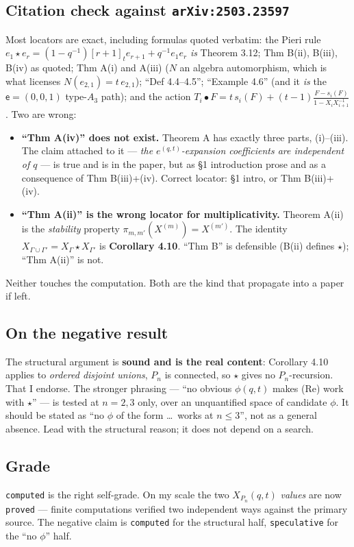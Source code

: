 \documentclass[11pt,a4paper]{article}
\newcommand{\rr}[1]{\texttt{#1}}
\begin{document}
\subsection{Citation check against \texttt{arXiv:2503.23597}}
Most locators are exact, including formulas quoted verbatim: the Pieri rule
$e_1\star e_r=(1-q^{-1})[r+1]_te_{r+1}+q^{-1}e_1e_r$ \emph{is} Theorem 3.12; Thm B(ii),
B(iii), B(iv) as quoted; Thm A(i) and A(iii) ($N$ an algebra automorphism, which is what
licenses $N(e_{2,1})=t\,e_{2,1}$); ``Def 4.4--4.5''; ``Example 4.6'' (and it \emph{is} the
$\mathsf e=(0,0,1)$ type-$A_3$ path); and the action
$T_i\bullet F=t\,s_i(F)+(t-1)\frac{F-s_i(F)}{1-X_iX_{i+1}^{-1}}$. Two are wrong:
\begin{itemize}
\item \textbf{``Thm A(iv)'' does not exist.} Theorem A has exactly three parts, (i)--(iii).
The claim attached to it --- \emph{the $e^{(q,t)}$-expansion coefficients are independent of
$q$} --- is true and is in the paper, but as \S1 introduction prose and as a consequence of
Thm B(iii)+(iv). Correct locator: \S1 intro, or Thm B(iii)+(iv).
\item \textbf{``Thm A(ii)'' is the wrong locator for multiplicativity.} Theorem A(ii) is the
\emph{stability} property $\pi_{m,m'}(X^{(m)})=X^{(m')}$. The identity
$X_{\Gamma\cup\Gamma'}=X_\Gamma\star X_{\Gamma'}$ is \textbf{Corollary 4.10}. ``Thm B'' is
defensible (B(ii) defines $\star$); ``Thm A(ii)'' is not.
\end{itemize}
Neither touches the computation. Both are the kind that propagate into a paper if left.

\subsection{On the negative result}
The structural argument is \textbf{sound and is the real content}: Corollary 4.10 applies to
\emph{ordered disjoint unions}, $P_n$ is connected, so $\star$ gives no $P_n$-recursion.
That I endorse. The stronger phrasing --- ``no obvious $\phi(q,t)$ makes (Re) work with
$\star$'' --- is tested at $n=2,3$ only, over an unquantified space of candidate $\phi$. It
should be stated as ``no $\phi$ of the form \dots\ works at $n\le3$'', not as a general
absence. Lead with the structural reason; it does not depend on a search.

\subsection{Grade}
\rr{computed} is the right self-grade. On my scale the two $X_{P_n}(q,t)$ \emph{values} are
now \rr{proved} --- finite computations verified two independent ways against the primary
source. The negative claim is \rr{computed} for the structural half, \rr{speculative} for
the ``no $\phi$'' half.
\end{document}
